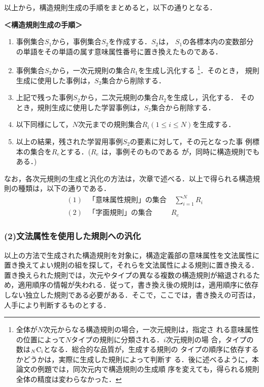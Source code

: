 以上から，構造規則生成の手順をまとめると，以下の通りとなる．
\vspace{\baselineskip}

\noindent
{\bf＜構造規則生成の手順＞}
\begin{enumerate}
\item 事例集合${S_1}$から，事例集合${S_2}$を作成する．${S_2}$は，
      ${S_1}$の各標本内の変数部分の単語をその単語の属す意味属性番号に置き換えたものである．
\item 事例集合${S_2}$から，一次元規則の集合${R_1}$を生成し汎化する
      \footnote{全体が$N$次元からなる構造規則の場合，一次元規則は，指定さ
      れる意味属性の位置によって$N$タイプの規則に分類される．$i$次元規則の場
      合，タイプの数は$_N\rm{C}_i$となる．総合的な品質が，生成する規則の
      タイプの順序に依存するかどうかは，実際に生成した規則によって判断す
      る．後に述べるように，本論文の例題では，同次元内で構造規則の生成順
      序を変えても，得られる規則全体の精度は変わらなかった．}．そのとき，
       規則生成に使用した事例は，${S_2}$集合から削除する．
\item 上記で残った事例${S_2}$から，二次元規則の集合${R_2}$を生成し，汎化する．
      そのとき，規則生成に使用した学習事例は，${S_2}$集合から削除する．
\item 以下同様にして，$N$次元までの規則集合${R_i(1\leq i\leq N)}$を生成する．
\item 以上の結果，残された学習用事例${S_2}$の要素に対して，その元となった事
      例標本の集合を${R_e}$とする．(${R_e}$ は，事例そのものである
      が，同時に構造規則でもある．)
\end{enumerate}\vspace{\baselineskip}

なお，各次元規則の生成と汎化の方法は，次章で述べる．以上で得られる構造規
則の種類は，以下の通りである．
\begin{eqnarray}
 &(1)&「意味属性規則」の集合 \ \ \ \ \ {\sum_{i=1}^N R_i}\\
 &(2)& 「字面規則」の集合 \ \ \ \ \ \ \ \ \ \ \ \ {R_e}
\end{eqnarray}
\subsubsection*{(2)文法属性を使用した規則への汎化}
以上の方法で生成された構造規則を対象に，構造定義部の意味属性を文法属性に
置き換えてよい規則の組を探して，それらを文法属性による規則に置き換える．
置き換えられた規則では，次元やタイプの異なる複数の構造規則が縮退されるた
め，適用順序の情報が失われる．従って，書き換え後の規則は，適用順序に依存
しない独立した規則である必要がある．そこで，ここでは，書き換えの可否は，
人手により判断するものとする．

